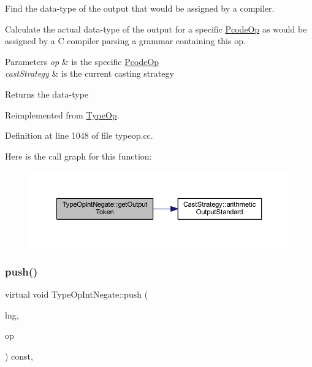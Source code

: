 Find the data-\/type of the output that would be assigned by a compiler. 

Calculate the actual data-\/type of the output for a specific \mbox{\hyperlink{class_pcode_op}{Pcode\+Op}} as would be assigned by a C compiler parsing a grammar containing this op. 
\begin{DoxyParams}{Parameters}
{\em op} & is the specific \mbox{\hyperlink{class_pcode_op}{Pcode\+Op}} \\
\hline
{\em cast\+Strategy} & is the current casting strategy \\
\hline
\end{DoxyParams}
\begin{DoxyReturn}{Returns}
the data-\/type 
\end{DoxyReturn}


Reimplemented from \mbox{\hyperlink{class_type_op_a7150ac93bb03a993735c829deb5237e7}{Type\+Op}}.



Definition at line 1048 of file typeop.\+cc.

Here is the call graph for this function\+:
\nopagebreak
\begin{figure}[H]
\begin{center}
\leavevmode
\includegraphics[width=350pt]{class_type_op_int_negate_ab07156bd47d9e57427cb3b32aa52f12e_cgraph}
\end{center}
\end{figure}
\mbox{\label{class_type_op_int_negate_aea54f310805501b412ad1423c681006e}} 
\subsubsection{\texorpdfstring{push()}{push()}}
{\footnotesize\ttfamily virtual void Type\+Op\+Int\+Negate\+::push (\begin{DoxyParamCaption}\item[{\mbox{\hyperlink{class_print_language}{Print\+Language}} $\ast$}]{lng,  }\item[{const \mbox{\hyperlink{class_pcode_op}{Pcode\+Op}} $\ast$}]{op }\end{DoxyParamCaption}) const\hspace{0.3cm}{\ttfamily [inline]}, {\ttfamily [virtual]}}



